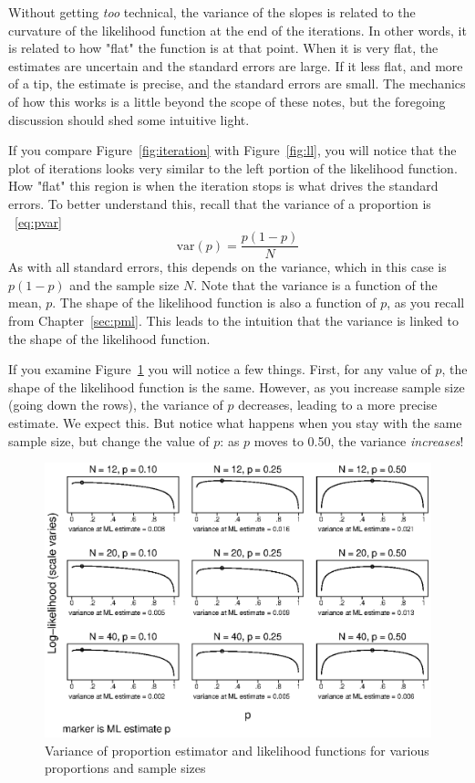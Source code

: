 Without getting {\it too} technical, the variance of the slopes is related to the curvature of the likelihood function at the end of the iterations. In other words, it is related to how "flat" the function is at that point. When it is very flat, the estimates are uncertain and the standard errors are large. If it less flat, and more of a tip, the estimate is precise, and the standard errors are small. The mechanics of how this works is a little beyond the scope of these notes, but the foregoing discussion should shed some intuitive light.

If you compare Figure~\ref{fig:iteration} with Figure~\ref{fig:ll}, you will notice that the plot of iterations looks very similar to the left portion of the likelihood function. How "flat" this region is when the iteration stops is what drives the standard errors. To better understand this, recall that the variance of a proportion is ~\eqref{eq:pvar}
\[
\mbox{var}\left(p\right) = \frac{p\left(1-p\right)}{N}
\]
As with all standard errors, this depends on the variance, which in this case is $p\left(1-p\right)$ and the sample size $N$. Note that the variance is a function of the mean, $p$. The shape of the likelihood function is also a function of $p$, as you recall from Chapter~\ref{sec:pml}. This leads to the intuition that the variance is linked to the shape of the likelihood function.

If you examine Figure~\ref{fig:MLse} you will notice a few things. First, for any value of $p$, the shape of the likelihood function is the same. However, as you increase sample size (going down the rows), the variance of $p$ decreases, leading to a more precise estimate. We expect this. But notice what happens when you stay with the same sample size, but change the value of $p$: as $p$ moves to 0.50, the variance {\it increases}!

\begin{figure}
   \centering
   \includegraphics[angle=0,
           width=.75\textwidth]{MLse.eps}
   \caption{Variance of proportion estimator and likelihood functions for various proportions and sample sizes}
  \label{fig:MLse}
\end{figure}

